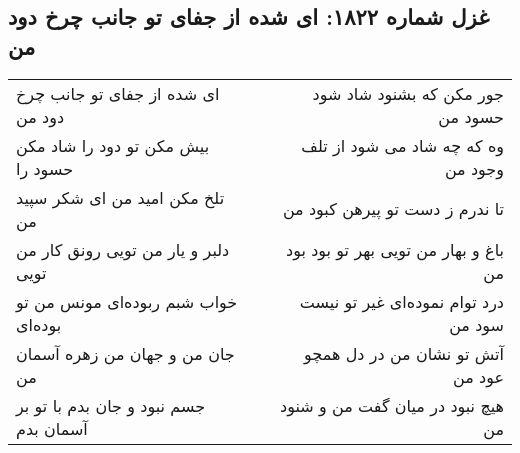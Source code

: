 \begin{center}
\section*{غزل شماره ۱۸۲۲: ای شده از جفای تو جانب چرخ دود من}
\label{sec:1822}
\begin{longtable}{l p{0.5cm} r}
ای شده از جفای تو جانب چرخ دود من
&&
جور مکن که بشنود شاد شود حسود من
\\
بیش مکن تو دود را شاد مکن حسود را
&&
وه که چه شاد می شود از تلف وجود من
\\
تلخ مکن امید من ای شکر سپید من
&&
تا ندرم ز دست تو پیرهن کبود من
\\
دلبر و یار من تویی رونق کار من تویی
&&
باغ و بهار من تویی بهر تو بود بود من
\\
خواب شبم ربوده‌ای مونس من تو بوده‌ای
&&
درد توام نموده‌ای غیر تو نیست سود من
\\
جان من و جهان من زهره آسمان من
&&
آتش تو نشان من در دل همچو عود من
\\
جسم نبود و جان بدم با تو بر آسمان بدم
&&
هیچ نبود در میان گفت من و شنود من
\\
\end{longtable}
\end{center}
